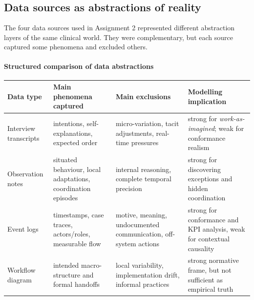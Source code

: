 \subsection{Data sources as abstractions of reality}
\label{subsec:a2_data_sources_abstractions}

The four data sources used in Assignment 2 represented different abstraction layers of the same clinical world. They were complementary, but each source captured some phenomena and excluded others.

\paragraph{Structured comparison of data abstractions}
\begin{center}
\small
\setlength{\tabcolsep}{5pt}
{
\renewcommand{\arraystretch}{1.2}
\begin{tabularx}{\textwidth}{>{\raggedright\arraybackslash}p{}>{\raggedright\arraybackslash}p{}>{\raggedright\arraybackslash}p{}>{\raggedright\arraybackslash}X}
\toprule
\rowcolor{black!12}
\textbf{Data type} & \textbf{Main phenomena captured} & \textbf{Main exclusions} & \textbf{Modelling implication} \\
\midrule
Interview transcripts & intentions, self-explanations, expected order & micro-variation, tacit adjustments, real-time pressures & strong for \textit{work-as-imagined}; weak for conformance realism \\
Observation notes & situated behaviour, local adaptations, coordination episodes & internal reasoning, complete temporal precision & strong for discovering exceptions and hidden coordination \\
Event logs & timestamps, case traces, actors/roles, measurable flow & motive, meaning, undocumented communication, off-system actions & strong for conformance and KPI analysis, weak for contextual causality \\
Workflow diagram & intended macro-structure and formal handoffs & local variability, implementation drift, informal practices & strong normative frame, but not sufficient as empirical truth \\
\bottomrule
\end{tabularx}
}
\end{center}

